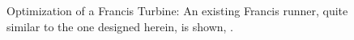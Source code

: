 \begin{figure}[h!]
\begin{minipage}[b]{1\linewidth}
 \centering
\end{minipage}
\caption{Optimization of a Francis Turbine: An existing Francis runner, quite similar to the one designed herein, is shown, \cite{andritz}. }%
\label{design-parameterization}
\end{figure}


